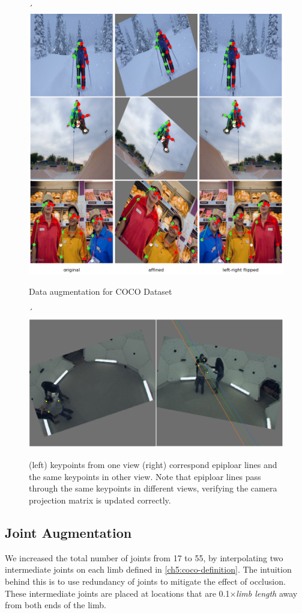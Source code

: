 \begin{figure}´
	\centering
	\includegraphics[width=0.7\columnwidth]{figures/ch5/coco-augmentation.png}
	\caption{Data augmentation for COCO Dataset} 
	\label{fig:ch5-coco-augmentation}
\end{figure}

\begin{figure}´
	\centering
	\includegraphics[width=1.0\columnwidth]{figures/ch5/panoptic-3d-epipolar-line.png}
	\caption{(left) keypoints from one view (right) correspond epiploar lines and the same keypoints in other view. Note that epiploar lines pass through the same keypoints in different views, verifying the camera projection matrix is updated correctly.} 
	\label{fig:ch5-cmu-epipolar-line}
\end{figure}

\subsection{Joint Augmentation}
We increased the total number of joints from 17 to 55, by interpolating two intermediate joints on each limb defined in \ref{ch5:coco-definition}. The intuition behind this is to use redundancy of joints to mitigate the effect of occlusion. These intermediate joints are placed at locations that are 0.1$\times$\textit{limb length} away from both ends of the limb.